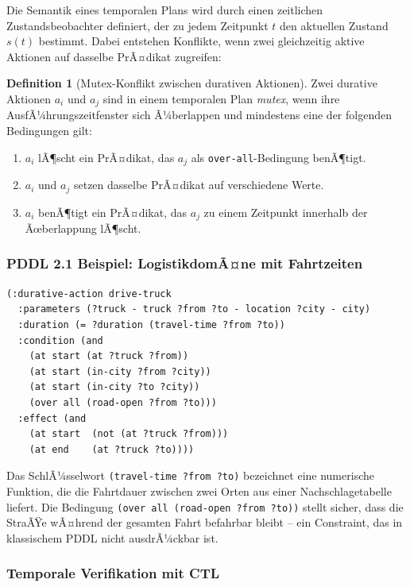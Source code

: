 ﻿\documentclass[a4paper,12pt]{article}
\theoremstyle{definition}
\newtheorem{definition}{Definition}[section]
\begin{document}
Die Semantik eines temporalen Plans wird durch einen zeitlichen Zustandsbeobachter definiert, der zu jedem Zeitpunkt $t$ den aktuellen Zustand $s(t)$ bestimmt. Dabei entstehen Konflikte, wenn zwei gleichzeitig aktive Aktionen auf dasselbe PrÃ¤dikat zugreifen:

\begin{definition}[Mutex-Konflikt zwischen durativen Aktionen]
Zwei durative Aktionen $a_i$ und $a_j$ sind in einem temporalen Plan \emph{mutex}, wenn ihre AusfÃ¼hrungszeitfenster sich Ã¼berlappen und mindestens eine der folgenden Bedingungen gilt:
\begin{enumerate}
  \item $a_i$ lÃ¶scht ein PrÃ¤dikat, das $a_j$ als \texttt{over-all}-Bedingung benÃ¶tigt.
  \item $a_i$ und $a_j$ setzen dasselbe PrÃ¤dikat auf verschiedene Werte.
  \item $a_i$ benÃ¶tigt ein PrÃ¤dikat, das $a_j$ zu einem Zeitpunkt innerhalb der Ãœberlappung lÃ¶scht.
\end{enumerate}
\end{definition}

\subsubsection{PDDL 2.1 Beispiel: LogistikdomÃ¤ne mit Fahrtzeiten}

\begin{lstlisting}[language=PDDL, caption=Durative Action in PDDL 2.1 -- Logistik mit Fahrtdauer]
(:durative-action drive-truck
  :parameters (?truck - truck ?from ?to - location ?city - city)
  :duration (= ?duration (travel-time ?from ?to))
  :condition (and
    (at start (at ?truck ?from))
    (at start (in-city ?from ?city))
    (at start (in-city ?to ?city))
    (over all (road-open ?from ?to)))
  :effect (and
    (at start  (not (at ?truck ?from)))
    (at end    (at ?truck ?to))))
\end{lstlisting}

Das SchlÃ¼sselwort \texttt{(travel-time ?from ?to)} bezeichnet eine numerische Funktion, die die Fahrtdauer zwischen zwei Orten aus einer Nachschlagetabelle liefert. Die Bedingung \texttt{(over all (road-open ?from ?to))} stellt sicher, dass die StraÃŸe wÃ¤hrend der gesamten Fahrt befahrbar bleibt -- ein Constraint, das in klassischem PDDL nicht ausdrÃ¼ckbar ist.

\subsubsection{Temporale Verifikation mit CTL}
\end{document}
